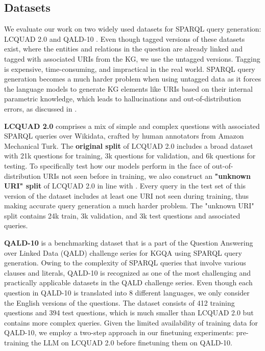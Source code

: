 \subsection{Datasets}
\label{sec:data}
We evaluate our work on two widely used datasets for SPARQL query generation: LCQUAD 2.0 \citep{lcquad2} and QALD-10 \citep{qald10}. Even though tagged versions of these datasets exist, where the entities and relations in the question are already linked and tagged with associated URIs from the KG, we use the untagged versions. Tagging is expensive, time-consuming, and impractical in the real world. SPARQL query generation becomes a much harder problem when using untagged data as it forces the language models to generate KG elements like URIs based on their internal parametric knowledge, which leads to hallucinations and out-of-distribution errors, as discussed in .

\noindent \textbf{LCQUAD 2.0} comprises a mix of simple and complex questions with associated SPARQL queries over Wikidata, crafted by human annotators from Amazon Mechanical Turk. The \textbf{original split} of LCQUAD 2.0 includes a broad dataset with 21k questions for training, 3k questions for validation, and 6k questions for testing. To specifically test how our models perform in the face of out-of-distribution URIs not seen before in training, we also construct an \textbf{"unknown URI" split} of LCQUAD 2.0 in line with \citet{reyd2023}. Every query in the test set of this version of the dataset includes at least one URI not seen during training, thus making accurate query generation a much harder problem. The "unknown URI" split contains 24k train, 3k validation, and 3k test questions and associated queries.

\noindent \textbf{QALD-10} is a benchmarking dataset that is a part of the  Question Answering over Linked Data (QALD) challenge series for KGQA using SPARQL query generation. Owing to the complexity of SPARQL queries that involve various clauses and literals, QALD-10 is recognized as one of the most challenging and practically applicable datasets in the QALD challenge series. Even though each question in QALD-10 is translated into 8 different languages, we only consider the English versions of the questions. The dataset consists of 412 training questions and 394 test questions, which is much smaller than LCQUAD 2.0 but contains more complex queries.
Given the limited availability of training data for QALD-10, we employ a two-step approach in our finetuning experiments: pre-training the LLM on LCQUAD 2.0 before finetuning them on QALD-10.

